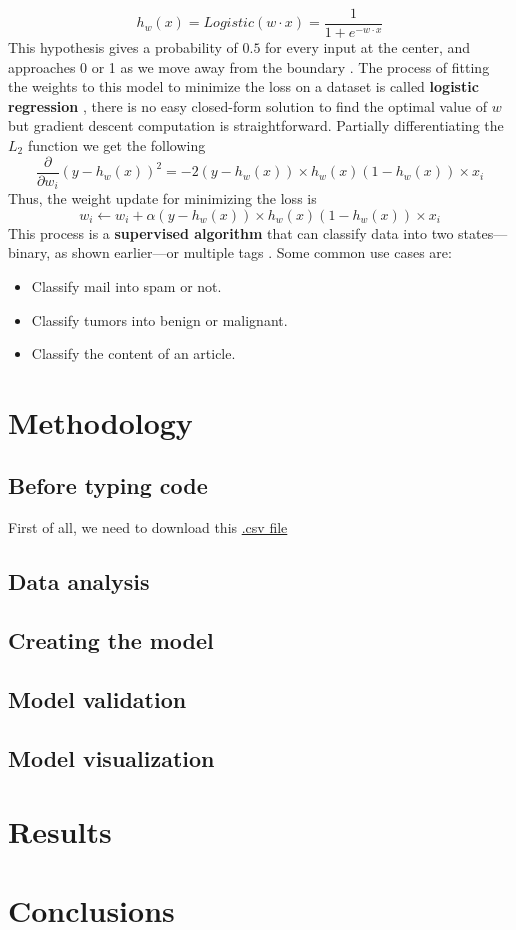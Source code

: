 \documentclass[10pt]{article}
\begin{document}
\begin{equation*}
  h_{w}(x) = Logistic(w \cdot x) = \frac{1}{1 + e^{-w \cdot x}}
\end{equation*}
This hypothesis gives a probability of $0.5$ for every input at the center, and approaches 0 or 1 as we move away from the boundary \cite{ai}. The process of fitting the weights to this model to minimize the loss on a dataset is called \textbf{logistic regression} \cite{ai}, there is no easy closed-form solution to find the optimal value of $w$ but gradient descent computation is straightforward. Partially differentiating the $L_{2}$ function we get the following
\begin{equation*}
  \frac{\partial}{\partial w_{i}}(y - h_{w}(x))^{2} = -2(y - h_{w}(x)) \times h_{w}(x)(1 - h_{w}(x)) \times x_{i}
\end{equation*}
Thus, the weight update for minimizing the loss is
\begin{equation*}
  w_{i} \leftarrow w_{i} + \alpha(y - h_{w}(x)) \times h_{w}(x)(1 - h_{w}(x)) \times x_{i}
\end{equation*}
This process is a \textbf{supervised algorithm} that can classify data into two states---binary, as shown earlier---or multiple tags \cite{aprendeML}. Some common use cases are:
\begin{itemize}
  \item Classify mail into spam or not.
  \item Classify tumors into benign or malignant.
  \item Classify the content of an article.
\end{itemize}

\section{Methodology}
\subsection{Before typing code}
First of all, we need to download this \href{http://www.aprendemachinelearning.com/wp-content/uploads/2017/11/usuarios_win_mac_lin.csv}{.csv file} \cite{aprendeML}

\subsection{Data analysis}
\subsection{Creating the model}
\subsection{Model validation}
\subsection{Model visualization}

\section{Results}

\section{Conclusions}

\cite{aprendeML}



\end{document}
